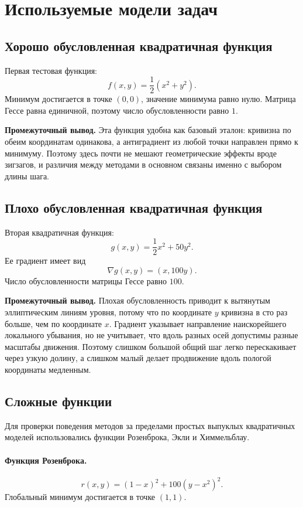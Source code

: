 ﻿\documentclass[14pt,a4paper]{extarticle}
\begin{document}
\section{Используемые модели задач}

\subsection{Хорошо обусловленная квадратичная функция}

Первая тестовая функция:
\[
    f(x,y)=\frac{1}{2}(x^2+y^2).
\]
Минимум достигается в точке $(0,0)$, значение минимума равно нулю. Матрица Гессе равна единичной, поэтому число обусловленности равно $1$.

\textbf{Промежуточный вывод.} Эта функция удобна как базовый эталон: кривизна по обеим координатам одинакова, а антиградиент из любой точки направлен прямо к минимуму. Поэтому здесь почти не мешают геометрические эффекты вроде зигзагов, и различия между методами в основном связаны именно с выбором длины шага.

\subsection{Плохо обусловленная квадратичная функция}

Вторая квадратичная функция:
\[
    g(x,y)=\frac{1}{2}x^2+50y^2.
\]
Ее градиент имеет вид
\[
    \nabla g(x,y) = (x,100y).
\]
Число обусловленности матрицы Гессе равно $100$.

\textbf{Промежуточный вывод.} Плохая обусловленность приводит к вытянутым эллиптическим линиям уровня, потому что по координате $y$ кривизна в сто раз больше, чем по координате $x$. Градиент указывает направление наискорейшего локального убывания, но не учитывает, что вдоль разных осей допустимы разные масштабы движения. Поэтому слишком большой общий шаг легко перескакивает через узкую долину, а слишком малый делает продвижение вдоль пологой координаты медленным.

\subsection{Сложные функции}

Для проверки поведения методов за пределами простых выпуклых квадратичных моделей использовались функции Розенброка, Экли и Химмельблау.

\paragraph{Функция Розенброка.}
\[
    r(x,y)=(1-x)^2+100(y-x^2)^2.
\]
Глобальный минимум достигается в точке $(1,1)$.
\end{document}
